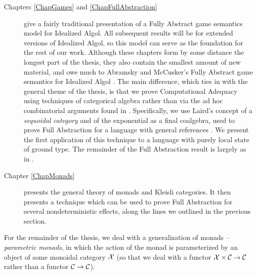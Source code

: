 \begin{description}
  \item[Chapters \ref{ChapGames} and \ref{ChapFullAbstraction}] give a fairly traditional presentation of a Fully Abstract game semantics model for Idealized Algol.  
    All subsequent results will be for extended versions of Idealized Algol, so this model can serve as the foundation for the rest of our work.  
    Although these chapters form by some distance the longest part of the thesis, they also contain the smallest amount of new material, and owe much to Abramsky and McCusker's Fully Abstract game semantics for Idealized Algol \cite{SamsonGuyIAActive}.  
    The main difference, which ties in with the general theme of the thesis, is that we prove Computational Adequacy using techniques of categorical algebra rather than via the ad hoc combinatorial arguments found in \cite{SamsonGuyIAActive}.  
    Specifically, we use Laird's concept of a \emph{sequoidal category} and of the exponential as a final coalgebra, used to prove Full Abstraction for a language with general references \cite{laird02}.  
    We present the first application of this technique to a language with purely local state of ground type.
    The remainder of the Full Abstraction result is largely as in \cite{SamsonGuyIAActive}.
  \item[Chapter \ref{ChapMonads}] presents the general theory of monads and Kleisli categories.  
    It then presents a technique which can be used to prove Full Abstraction for several nondeterministic effects, along the lines we outlined in the previous section.
\end{description}
For the remainder of the thesis, we deal with a generalization of monads -- \emph{parametric monads}, in which the action of the monad is parameterized by an object of some monoidal category $\mathcal X$ (so that we deal with a functor $\mathcal X \times {\mathcal{C}} \to {\mathcal{C}}$ rather than a functor ${\mathcal{C}} \to {\mathcal{C}}$).
